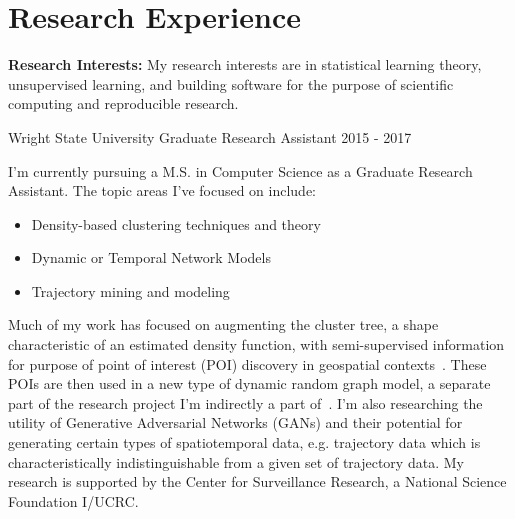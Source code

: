 \documentclass[11pt,a4paper,sans]{moderncv} %
\begin{document}

%


\section{Research Experience}
\textbf{Research Interests: } My research interests are in statistical learning theory, unsupervised learning, and building software for the purpose of scientific computing and reproducible research.  
\newline 


			 {Wright State University}
			 {Graduate Research Assistant}
			 {2015 - 2017}{}
{  \vspace{3pt}
I'm currently pursuing a M.S. in Computer Science as a Graduate Research Assistant. The topic areas I've focused on include: 
	\begin{itemize}
		\item Density-based clustering techniques and theory 
		\item Dynamic or Temporal Network Models
		\item Trajectory mining and modeling
	\end{itemize}
Much of my work has focused on augmenting the cluster tree, a shape characteristic of an estimated density function, with semi-supervised information for purpose of point of interest (POI) discovery in geospatial contexts~\cite{poi_paper}. These POIs are then used in a new type of dynamic random graph model, a separate part of the research project I'm indirectly a part of~\cite{robinson2017seasonality}. 
I'm also researching the utility of Generative Adversarial Networks (GANs) and their potential for generating certain types of spatiotemporal data, e.g. trajectory data which is characteristically indistinguishable from a given set of trajectory data. My research is supported by the Center for Surveillance Research, a National Science Foundation I/UCRC.
}
\end{document}
